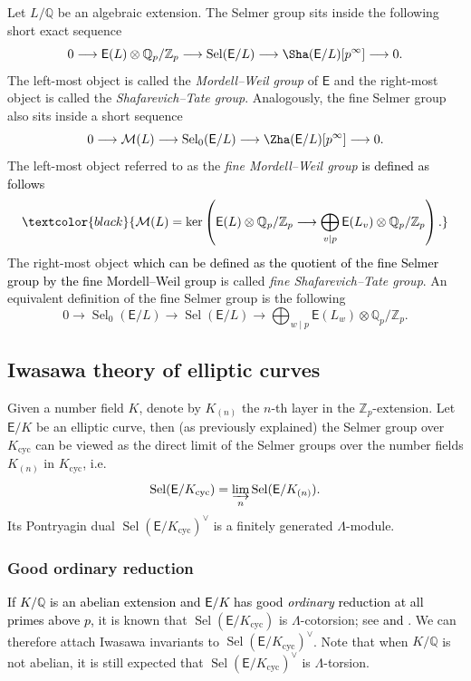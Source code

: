 \documentclass{amsart}
\newcommand{\edit}[1]{\textcolor{black}{#1}}
\numberwithin{equation}{section}
\theoremstyle{remark}
\newcommand{\EC}{\mathsf{E}}
\newcommand{\cM}{\mathcal{M}}
\newcommand{\Qp}{\mathbb{Q}_p}
\newcommand{\Zp}{\mathbb{Z}_p}
\newcommand{\Z}{\mathbb{Z}}
\newcommand{\Q}{\mathbb{Q}}
\newcommand{\cyc}{\operatorname{{cyc}}}
\newcommand{\Sel}{\operatorname{Sel}}
\theoremstyle{plain} %
\begin{document}
Let $L/\Q$ be an algebraic extension.
The Selmer group sits inside the following short exact sequence
\[
0 \longrightarrow \EC(L) \otimes \Qp/\Zp \longrightarrow \Sel(\EC/L) \longrightarrow \Sha(\EC/L)[p^\infty] \longrightarrow 0.
\]
The left-most object is called the \emph{Mordell--Weil group} of $\EC$ and the right-most object is called the \emph{Shafarevich--Tate group}.
Analogously, the fine Selmer group also sits inside a short sequence
\[
0 \longrightarrow \cM(L) \longrightarrow \Sel_0(\EC/L) \longrightarrow \Zha(\EC/L)[p^\infty] \longrightarrow 0.
\]
The left-most object referred to as the \emph{fine Mordell--Weil group}
\edit{is defined as follows}
\[
\edit{\cM(L) = \ker\left(\EC(L) \otimes \Q_p/\Z_p \longrightarrow \bigoplus_{v\mid p} \EC(L_v) \otimes \Q_p/\Z_p\right).}
\]
The right-most object \edit{which can be defined as the quotient of the fine Selmer group by the fine Mordell--Weil group} is called 
\emph{fine Shafarevich--Tate group}.
An equivalent definition of the fine Selmer group is the following
\begin{equation}
\label{alternative defn of FSG}
0 \longrightarrow \Sel_0(\EC/L) \longrightarrow \Sel(\EC/L) \longrightarrow \bigoplus_{w\mid p} \EC(L_w) \otimes \Qp/\Zp.
\end{equation}

\subsection{Iwasawa theory of elliptic curves}
Given a number field $K$, denote by $K_{(n)}$ the $n$-th layer in the $\Z_p$-extension.
Let $\EC/K$ be an elliptic curve, then (as previously explained) the Selmer group over $K_{\cyc}$ can be viewed as the direct limit of the Selmer groups over the number fields $K_{(n)}$ in $K_{\cyc}$, i.e.
\[
\Sel(\EC/K_{\cyc})=\varinjlim_n \Sel(\EC/K_{(n)}).
\]
Its Pontryagin dual $\Sel(\EC/K_{\cyc})^\vee$ is a finitely generated $\Lambda$-module.

\subsubsection{Good ordinary reduction}
\edit{If $K/\Q$ is an abelian extension and $\EC/K$ has good \emph{ordinary} reduction at all primes above $p$,}
it is known that $\Sel(\EC/K_{\cyc})$ is $\Lambda$-cotorsion; see \edit{\cite[Theorem~17.4(1)]{Kat04} and \cite[Theorem~1.5]{Gre98}}.
We can therefore attach Iwasawa invariants to $\Sel(\EC/K_{\cyc})^\vee$.
Note that when $K/\Q$ is not abelian, it is still expected that $\Sel(\EC/K_{\cyc})^\vee$ is $\Lambda$-torsion.
\end{document}

